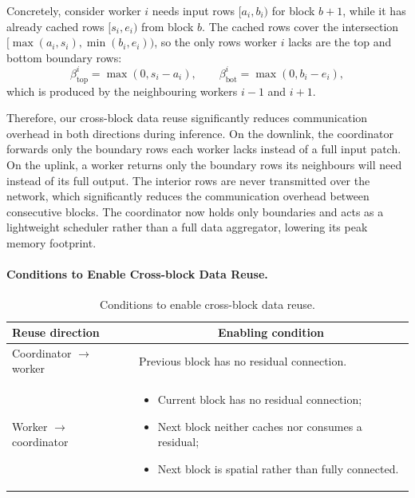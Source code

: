 Concretely, consider worker $i$ needs input rows $[a_i, b_i)$ for block $b+1$, while it has already cached rows $[s_i, e_i)$ from block $b$. The cached rows cover the intersection $[\max(a_i, s_i),\min(b_i, e_i))$, so the only rows worker $i$ lacks are the top and bottom boundary rows: 
\begin{equation}
    \beta^i_{\mathrm{top}} = \max(0, s_i - a_i),
    \qquad
    \beta^i_{\mathrm{bot}} = \max(0, b_i - e_i),
    \label{eq:boundary}
\end{equation}
which is produced by the neighbouring workers $i-1$ and $i+1$. 

Therefore, our cross-block data reuse significantly reduces communication overhead in both directions during inference.
On the downlink, the coordinator forwards only the boundary rows each worker lacks instead of a full input patch. 
On the uplink, a worker returns only the boundary rows its neighbours will need instead of its full output. 
The interior rows are never transmitted over the network, which significantly reduces the communication overhead between consecutive blocks. 
The coordinator now holds only boundaries and acts as a lightweight scheduler rather than a full data aggregator, lowering its peak memory footprint. 

\paragraph{Conditions to Enable Cross-block Data Reuse.}
\label{sec:cross-conditions}

\begin{table}
    \centering
    \caption{Conditions to enable cross-block data reuse.}
    \begin{tabular}{m{3.5cm} m{7.0cm}}
        \hline
        \textbf{Reuse direction} & \multicolumn{1}{c}{\textbf{Enabling condition}} \\
        \hline
        Coordinator $\rightarrow$ worker & Previous block has no residual connection. \\
        \hline
        Worker $\rightarrow$ coordinator &
            \begin{itemize}[leftmargin=*, topsep=0pt, itemsep=1pt, nosep]
                \item Current block has no residual connection;
                \item Next block neither caches nor consumes a residual;
                \item Next block is spatial rather than fully connected.
            \end{itemize} \\
        \hline
    \end{tabular}

\label{tab:reuse-conditions}
\end{table}

